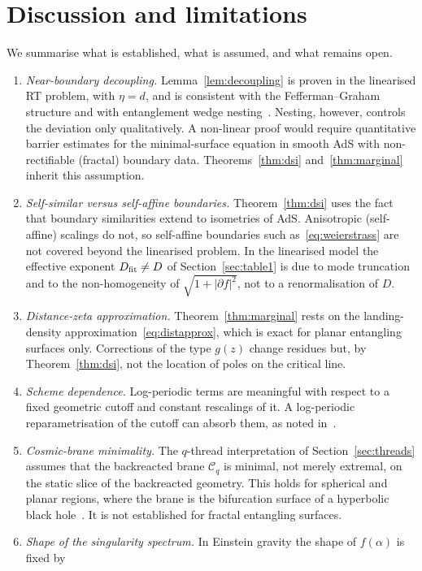 \documentclass[11pt]{article}
\theoremstyle{definition}\newtheorem{definition}{Definition}[section]
\theoremstyle{remark}\newtheorem*{remark}{Remark}
\begin{document}
\section{Discussion and limitations}
\label{sec:discussion}
We summarise what is established, what is assumed, and what remains open.
\begin{enumerate}
\item \emph{Near-boundary decoupling.} Lemma~\ref{lem:decoupling} is proven in the linearised RT problem,
with $\eta=d$, and is consistent with the Fefferman--Graham structure and with entanglement wedge
nesting~\cite{Wall}. Nesting, however, controls the deviation only qualitatively. A non-linear proof would
require quantitative barrier estimates for the minimal-surface equation in smooth AdS with non-rectifiable
(fractal) boundary data. Theorems~\ref{thm:dsi} and~\ref{thm:marginal} inherit this assumption.
\item \emph{Self-similar versus self-affine boundaries.} Theorem~\ref{thm:dsi} uses the fact that boundary
similarities extend to isometries of AdS. Anisotropic (self-affine) scalings do not, so self-affine
boundaries such as~\eqref{eq:weierstrass} are not covered beyond the linearised problem. In the linearised
model the effective exponent $D_{\rm fit}\neq D$ of Section~\ref{sec:table1} is due to mode truncation and to
the non-homogeneity of $\sqrt{1+|\partial f|^2}$, not to a renormalisation of $D$.
\item \emph{Distance-zeta approximation.} Theorem~\ref{thm:marginal} rests on the landing-density
approximation~\eqref{eq:distapprox}, which is exact for planar entangling surfaces only. Corrections of the
type $g(z)$ change residues but, by Theorem~\ref{thm:dsi}, not the location of poles on the critical line.
\item \emph{Scheme dependence.} Log-periodic terms are meaningful with respect to a fixed geometric cutoff
and constant rescalings of it. A log-periodic reparametrisation of the cutoff can absorb them, as noted
in~\cite{FarajiAstaneh}.
\item \emph{Cosmic-brane minimality.} The $q$-thread interpretation of Section~\ref{sec:threads} assumes that
the backreacted brane $\mathcal C_q$ is minimal, not merely extremal, on the static slice of the backreacted
geometry. This holds for spherical and planar regions, where the brane is the bifurcation surface of a
hyperbolic black hole~\cite{HMSY,Dong}. It is not established for fractal entangling surfaces.
\item \emph{Shape of the singularity spectrum.} In Einstein gravity the shape of $f(\alpha)$ is fixed by

\end{enumerate}
\end{document}
